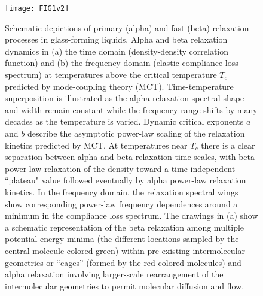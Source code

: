\documentclass[reprint,showpacs,amsmath,amssymb,aip,jcp]{revtex4-1}
\begin{document}
\begin{figure}
  \begin{center}
    \texttt{[image: FIG1v2]}
  \end{center}
  \caption{\label{fig:correlators} Schematic depictions of primary
    (alpha) and fast (beta) relaxation processes in glass-forming
    liquids. Alpha and beta relaxation dynamics in (a) the time domain
    (density-density correlation function) and (b) the frequency
    domain (elastic compliance loss spectrum) at temperatures above
    the critical temperature $T_c$ predicted by mode-coupling theory
    (MCT). Time-temperature superposition is illustrated as the alpha
    relaxation spectral shape and width remain constant while the
    frequency range shifts by many decades as the temperature is
    varied. Dynamic critical exponents $a$ and $b$ describe the
    asymptotic power-law scaling of the relaxation kinetics predicted
    by MCT. At temperatures near $T_c$ there is a clear separation
    between alpha and beta relaxation time scales, with beta power-law
    relaxation of the density toward a time-independent ``plateau"
    value followed eventually by alpha power-law relaxation
    kinetics. In the frequency domain, the relaxation spectral wings
    show corresponding power-law frequency dependences around a
    minimum in the compliance loss spectrum. The drawings in (a) show
    a schematic representation of the beta relaxation among multiple
    potential energy minima (the different locations sampled by the
    central molecule colored green) within pre-existing intermolecular
    geometries or ``cages'' (formed by the red-colored molecules) and
    alpha relaxation involving larger-scale rearrangement of the
    intermolecular geometries to permit molecular diffusion and
    flow. }
\end{figure}
\end{document}
